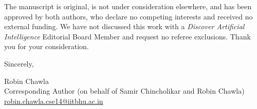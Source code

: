 \documentclass[12pt]{article}
\begin{document}
The manuscript is original, is not under consideration elsewhere, and has been approved by both authors, who declare no competing interests and received no external funding. We have not discussed this work with a \emph{Discover Artificial Intelligence} Editorial Board Member and request no referee exclusions. Thank you for your consideration.

\vspace{12pt}
\noindent Sincerely,

\vspace{2pt}
\noindent Robin Chawla\\
Corresponding Author (on behalf of Samir Chincholikar and Robin Chawla)\\
\href{mailto:robin.chawla.cse14@iitbhu.ac.in}{robin.chawla.cse14@iitbhu.ac.in}
\end{document}
